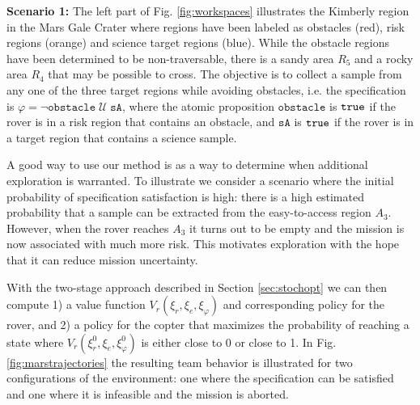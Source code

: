 \documentclass[conference]{IEEEtran}
\begin{document}
\smallskip
\noindent \textbf{Scenario 1:} The left part of Fig. \ref{fig:workspaces} illustrates the Kimberly region in the Mars Gale Crater where regions have been labeled as obstacles (red), risk regions (orange) and science target regions (blue). While the obstacle regions have been determined to be non-traversable, there is a sandy area $R_5$ and a rocky area $R_4$ that may be possible to cross. The objective is to collect a sample from any one of the three target regions while avoiding obstacles, i.e. the specification is $\varphi = \lnot \texttt{obstacle} \; \mathcal U \; \texttt{sA}$, where the atomic proposition $\texttt{obstacle}$ is $\texttt{true}$ if the rover is in a risk region that contains an obstacle, and $\texttt{sA}$ is $\texttt{true}$ if the rover is in a target region that contains a science sample.

A good way to use our method is as a way to determine when additional exploration is warranted. To illustrate we consider a scenario where the initial probability of specification satisfaction is high: there is a high estimated probability that a sample can be extracted from the easy-to-access region $A_3$. However, when the rover reaches $A_3$ it turns out to be empty and the mission is now associated with much more risk. This motivates exploration with the hope that it can reduce mission uncertainty. 

With the two-stage approach described in Section \ref{sec:stochopt} we can then compute 1) a value function $V_r(\xi_r, \xi_e, \xi_\varphi)$ and corresponding policy for the rover, and 2) a policy for the copter that maximizes the probability of reaching a state where $V_r(\xi_r^0, \xi_e, \xi_\varphi^0)$ is either close to 0 or close to 1. In Fig. \ref{fig:marstrajectories} the resulting team behavior is illustrated for two configurations of the environment: one where the specification can be satisfied and one where it is infeasible and the mission is aborted.
\end{document}
